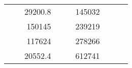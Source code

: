 \begin{table}[H]
\begin{tabular}{|ccrccrccc}
\multicolumn{1}{|c|}{\cellcolor[HTML]{FFFFC7}}                                & \multicolumn{1}{c|}{\cellcolor[HTML]{DDFDFF}}                      & \multicolumn{1}{r|}{\cellcolor[HTML]{DAE8FC}29200.8}   & \multicolumn{1}{c|}{\cellcolor[HTML]{FFFFC7}}                                & \multicolumn{1}{c|}{\cellcolor[HTML]{DDFDFF}}                       & \multicolumn{1}{r|}{\cellcolor[HTML]{DDFDFF}145032}    &                                                                              &                                                                    &                                                        \\ \cline{3-3} \cline{6-6}
\multicolumn{1}{|c|}{\cellcolor[HTML]{FFFFC7}}                                & \multicolumn{1}{c|}{\cellcolor[HTML]{DDFDFF}}                      & \multicolumn{1}{r|}{\cellcolor[HTML]{DDFDFF}150145}    & \multicolumn{1}{c|}{\cellcolor[HTML]{FFFFC7}}                                & \multicolumn{1}{c|}{\cellcolor[HTML]{DDFDFF}}                       & \multicolumn{1}{r|}{\cellcolor[HTML]{DAE8FC}239219}    &                                                                              &                                                                    &                                                        \\ \cline{3-3} \cline{6-6}
\multicolumn{1}{|c|}{\cellcolor[HTML]{FFFFC7}}                                & \multicolumn{1}{c|}{\cellcolor[HTML]{DDFDFF}}                      & \multicolumn{1}{r|}{\cellcolor[HTML]{DAE8FC}117624}    & \multicolumn{1}{c|}{\cellcolor[HTML]{FFFFC7}}                                & \multicolumn{1}{c|}{\cellcolor[HTML]{DDFDFF}}                       & \multicolumn{1}{r|}{\cellcolor[HTML]{DDFDFF}278266}    &                                                                              &                                                                    &                                                        \\ \cline{3-3} \cline{6-6}
\multicolumn{1}{|c|}{\cellcolor[HTML]{FFFFC7}}                                & \multicolumn{1}{c|}{\cellcolor[HTML]{DDFDFF}}                      & \multicolumn{1}{r|}{\cellcolor[HTML]{DDFDFF}20552.4}   & \multicolumn{1}{c|}{\cellcolor[HTML]{FFFFC7}}                                & \multicolumn{1}{c|}{\cellcolor[HTML]{DDFDFF}}                       & \multicolumn{1}{r|}{\cellcolor[HTML]{DAE8FC}612741}    &                                                                              &                                                                    &                                                        \\ \cline{3-3} \cline{6-6}

\end{tabular}
\end{table}
